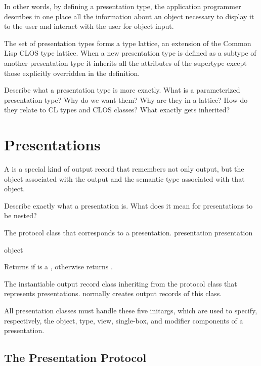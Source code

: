 In other words, by defining a presentation type, the application programmer
describes in one place all the information about an object necessary to display
it to the user and interact with the user for object input.

The set of presentation types forms a type lattice, an extension of the Common
Lisp CLOS type lattice.  When a new presentation type is defined as a subtype of
another presentation type it inherits all the attributes of the supertype except
those explicitly overridden in the definition.

 {Describe what a presentation type is more exactly.  What is a
parameterized presentation type?  Why do we want them?  Why are they in a
lattice?  How do they relate to CL types and CLOS classes?  What exactly gets
inherited?}


\section {Presentations}

A  is a special kind of output record that remembers not
only output, but the object associated with the output and the semantic type
associated with that object.

 {Describe exactly what a presentation is.  What does it mean for
presentations to be nested?}


The protocol class that corresponds to a presentation.
 {presentation} {presentation}

 {object}

Returns  if  is a , otherwise returns
.


The instantiable output record class inheriting from the protocol class
 that represents presentations.   normally
creates output records of this class.
\Mutable


All presentation classes must handle these five initargs, which are used to
specify, respectively, the object, type, view, single-box, and modifier
components of a presentation.


\subsection {The Presentation Protocol}

